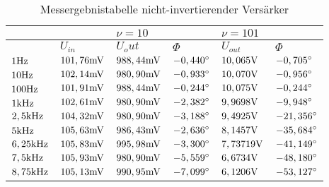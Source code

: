 \begin{table}[H]
\centering
\caption{Messergebnistabelle nicht-invertierender Versärker}
\label{tab:niinv_erg_tab}
\begin{tabular}{ll|l|l|l|l|}
\cline{3-6}
                                                   &                & \multicolumn{2}{l|}{$\nu = 10$}     & \multicolumn{2}{l|}{$\nu=101$}          \\ \hline
\rowcolor[HTML]{C0C0C0} 
\multicolumn{1}{|l|}{\cellcolor[HTML]{C0C0C0}$f $} & $ U_{in}     $ & $ U{_out} $    & $ \Phi $           & $ U_{out} $       & $ \Phi $            \\ \hline
\multicolumn{1}{|l|}{$1\text{Hz}        $}               & $ 101,76\text{mV} $  & $ 988,44\text{mV}  $ & $ -0,440^\circ  $ & $ 10,065\text{V}      $ & $ -0,705^\circ   $ \\ \hline
\multicolumn{1}{|l|}{$10\text{Hz}      $}                & $ 102,14\text{mV} $  & $ 980,90\text{mV}  $ & $ -0,933^\circ  $ & $ 10,070\text{V}      $ & $ -0,956^\circ   $ \\ \hline
\multicolumn{1}{|l|}{$100\text{Hz}      $}               & $ 101,91\text{mV} $  & $ 988,44\text{mV}  $ & $ -0,244^\circ  $ & $ 10,075\text{V}      $ & $ -0,244^\circ   $ \\ \hline
\multicolumn{1}{|l|}{$1\text{kHz}      $}                & $ 102,61\text{mV} $  & $ 980,90\text{mV}  $ & $ -2,382^\circ  $ & $ 9,9698\text{V}      $ & $ -9,948^\circ  $  \\ \hline
\multicolumn{1}{|l|}{$2,5\text{kHz}    $}                & $ 104,32\text{mV} $  & $ 980,90\text{mV}  $ & $ -3,188^\circ  $ & $ 9,4925\text{V}      $ & $ -21,356^\circ  $ \\ \hline
\multicolumn{1}{|l|}{$5\text{kHz}      $}                & $ 105,63\text{mV} $  & $ 986,43\text{mV}  $ & $ -2,636^\circ  $ & $ 8,1457 \text{V}     $ & $ -35,684^\circ  $ \\ \hline
\multicolumn{1}{|l|}{$6,25\text{kHz}   $}                & $ 105,83\text{mV} $  & $ 995,98\text{mV}  $ & $ -3,300^\circ  $ & $ 7,73719\text{V}     $ & $ -41,149^\circ  $ \\ \hline
\multicolumn{1}{|l|}{$7,5\text{kHz}    $}                & $ 105,93\text{mV} $  & $ 980,90\text{mV}  $ & $ -5,559^\circ  $ & $ 6,6734\text{V}      $ & $ -48,180^\circ  $ \\ \hline
\multicolumn{1}{|l|}{$8,75\text{kHz}   $}                & $ 105,13\text{mV} $  & $ 990,95\text{mV}  $ & $ -7,099^\circ  $ & $ 6,1206\text{V}      $ & $ -53,127^\circ  $ \\ \hline

\end{tabular}
\end{table}
